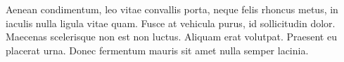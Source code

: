 \documentclass[twoside]{article}
\begin{document}
\begin{pages}
\begin{Rightside}
	Aenean condimentum, leo vitae convallis porta, neque felis rhoncus metus, in iaculis nulla ligula vitae quam. Fusce at vehicula purus, id sollicitudin dolor. Maecenas scelerisque non est non luctus. Aliquam erat volutpat. Praesent eu placerat urna. Donec fermentum mauris sit amet nulla semper lacinia.

    \endnumbering
  \end{Rightside}

\end{pages}
  \Pages
\end{document}
